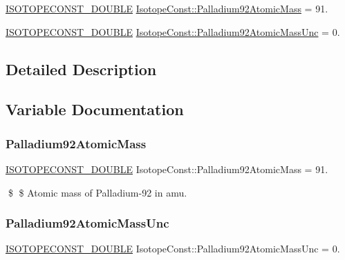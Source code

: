 \begin{DoxyCompactItemize}
\item 
\mbox{\hyperlink{group___isotope_const-_macros_ga8f45a7272ce02c0b4c65c44636ed719a}{I\+S\+O\+T\+O\+P\+E\+C\+O\+N\+S\+T\+\_\+\+D\+O\+U\+B\+LE}} \mbox{\hyperlink{group___isotope_const-_palladium-_pd92_gace80ad27abc5adc0b78fe3439dc54a2a}{Isotope\+Const\+::\+Palladium92\+Atomic\+Mass}} = 91.
\item 
\mbox{\hyperlink{group___isotope_const-_macros_ga8f45a7272ce02c0b4c65c44636ed719a}{I\+S\+O\+T\+O\+P\+E\+C\+O\+N\+S\+T\+\_\+\+D\+O\+U\+B\+LE}} \mbox{\hyperlink{group___isotope_const-_palladium-_pd92_ga3703a31c88409f3d83b48af9df396805}{Isotope\+Const\+::\+Palladium92\+Atomic\+Mass\+Unc}} = 0.
\end{DoxyCompactItemize}


\subsection{Detailed Description}


\subsection{Variable Documentation}
\mbox{\label{group___isotope_const-_palladium-_pd92_gace80ad27abc5adc0b78fe3439dc54a2a}} 
\subsubsection{\texorpdfstring{Palladium92\+Atomic\+Mass}{Palladium92AtomicMass}}
{\footnotesize\ttfamily \mbox{\hyperlink{group___isotope_const-_macros_ga8f45a7272ce02c0b4c65c44636ed719a}{I\+S\+O\+T\+O\+P\+E\+C\+O\+N\+S\+T\+\_\+\+D\+O\+U\+B\+LE}} Isotope\+Const\+::\+Palladium92\+Atomic\+Mass = 91.}

\$ \$ Atomic mass of Palladium-\/92 in amu. \mbox{\label{group___isotope_const-_palladium-_pd92_ga3703a31c88409f3d83b48af9df396805}} 
\subsubsection{\texorpdfstring{Palladium92\+Atomic\+Mass\+Unc}{Palladium92AtomicMassUnc}}
{\footnotesize\ttfamily \mbox{\hyperlink{group___isotope_const-_macros_ga8f45a7272ce02c0b4c65c44636ed719a}{I\+S\+O\+T\+O\+P\+E\+C\+O\+N\+S\+T\+\_\+\+D\+O\+U\+B\+LE}} Isotope\+Const\+::\+Palladium92\+Atomic\+Mass\+Unc = 0.}

